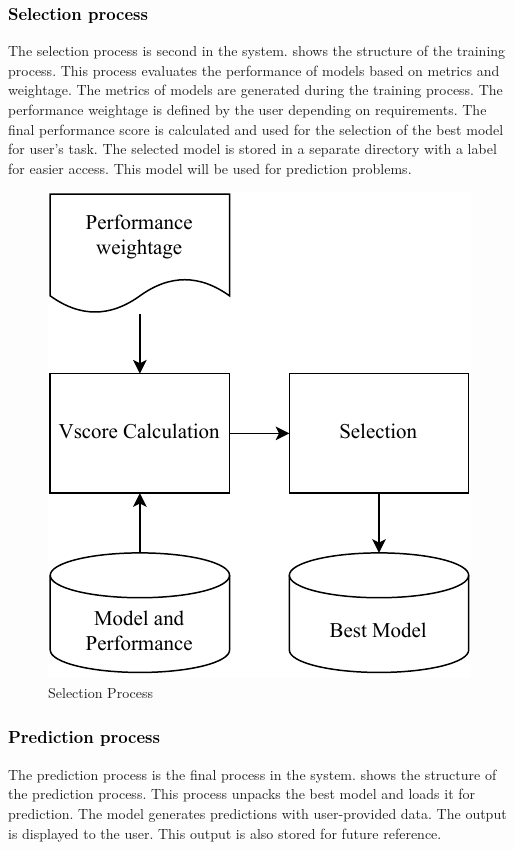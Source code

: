 \documentclass[a4paper,fleqn]{cas-dc}
\newcommand{\responsemodsm}[1]{\textcolor{black}{#1}}
\newcommand{\subsubsectionb}[1]{\subsubsection{\responsemodsm{#1}}}
\begin{document}
\subsubsectionb{Selection process}\label{subsubsec:selection_process}

The selection process is second in the system.  shows the structure of the training process. This process evaluates the performance of models based on metrics and weightage. The metrics of models are generated during the training process. The performance weightage is defined by the user depending on requirements. The final performance score is calculated and used for the selection of the best model for user's task. The selected model is stored in a separate directory with a label for easier access. This model will be used for prediction problems.

\begin{figure}[ht]
    \centering
    \includegraphics[width=0.7\columnwidth]{selection.pdf}
    \caption{Selection Process}
    \label{fig:selection_process}
\end{figure}

\subsubsectionb{Prediction process}\label{subsubsec:prediction_process}

The prediction process is the final process in the system.  shows the structure of the prediction process. This process unpacks the best model and loads it for prediction. The model generates predictions with user-provided data. The output is displayed to the user. This output is also stored for future reference.
\end{document}
